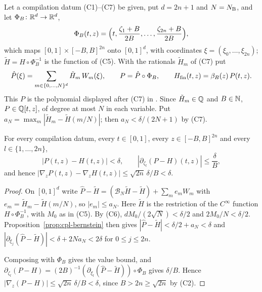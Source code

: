 \begin{definition}\label{def:cpl-Hfin}
Let a compilation datum (C1)--(C7) be given, put $d=2n+1$ and $N=N_{\rm B}$, and let $\Phi_B\colon\mathbb{R}^d\to\mathbb{R}^d$,
\[
 \Phi_B(t,z)=\Bigl(t,\frac{\zeta_1+B}{2B},\dots,\frac{\zeta_{2n}+B}{2B}\Bigr),
\]
which maps $[0,1]\times[-B,B]^{2n}$ onto $[0,1]^d$, with coordinates
$\xi=(\xi_0,\dots,\xi_{2n})$; $\tilde H=H\circ\Phi_B^{-1}$ is the function of (C5). With the rationals
$\tilde H_m$ of (C7) put
\[
 \hat P(\xi)=\sum_{m\in\{0,\dots,N\}^d}\tilde H_m\,W_m(\xi),\qquad P=\hat P\circ\Phi_B,\qquad
 H_{\mathrm{fin}}(t,z)=\beta_B(z)\,P(t,z).
\]
This $P$ is the polynomial displayed after (C7) in . Since $\tilde H_m\in\mathbb{Q}$ and $B\in\mathbb{N}$,
$P\in\mathbb{Q}[t,z]$, of degree at most $N$ in each variable. Put $a_N=\max_m|\tilde H_m-\tilde H(m/N)|$; then
$a_N<\delta/(2N+1)$ by (C7).
\end{definition}

\begin{lemma}\label{lem:cpl-poly}
For every compilation datum, every $t\in[0,1]$, every $z\in[-B,B]^{2n}$ and every $l\in\{1,\dots,2n\}$,
\[
 |P(t,z)-H(t,z)|<\delta,\qquad |\partial_{\zeta_l}(P-H)(t,z)|\le\frac\delta B,
\]
and hence $|\nabla_zP(t,z)-\nabla_zH(t,z)|\le\sqrt{2n}\,\delta/B<\delta$.
\end{lemma}

\begin{proof}
On $[0,1]^d$ write $\hat P-\tilde H=(\mathcal B_N\tilde H-\tilde H)+\sum_me_mW_m$ with $e_m=\tilde H_m-\tilde H(m/N)$, so $|e_m|\le a_N$. Here $\tilde H$ is the restriction of the $C^\infty$ function $H\circ\Phi_B^{-1}$, with $M_0$ as in (C5). By (C6), $dM_0/(2\sqrt N)<\delta/2$ and $2M_0/N<\delta/2$. Proposition~\ref{prop:cpl-bernstein} then gives $|\hat P-\tilde H|<\delta/2+a_N<\delta$ and $|\partial_{\xi_j}(\hat P-\tilde H)|<\delta+2Na_N<2\delta$ for $0\le j\le2n$.

Composing with $\Phi_B$ gives the value bound, and $\partial_{\zeta_l}(P-H)=(2B)^{-1}(\partial_{\xi_l}(\hat P-\tilde H))\circ\Phi_B$ gives $\delta/B$. Hence $|\nabla_z(P-H)|\le\sqrt{2n}\,\delta/B<\delta$, since $B>2n\ge\sqrt{2n}$ by (C2).
\end{proof}

